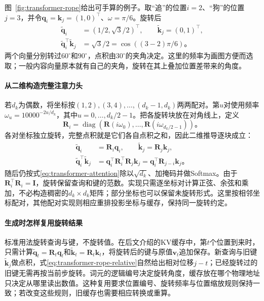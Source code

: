 图~\ref{fig:transformer-rope}给出可手算的例子。取“追”的位置$i=2$、“狗”的位置$j=3$，并令$\bm q_i=\bm k_j=(1,0)^{\top}$、$\omega=\pi/6$。旋转后
\[
  \begin{aligned}
    \widetilde{\bm q}_i&=(1/2,\sqrt3/2)^{\top},\qquad
    \widetilde{\bm k}_j=(0,1)^{\top},\\
    \widetilde{\bm q}_i^{\top}\widetilde{\bm k}_j
      &=\sqrt3/2=\cos((3-2)\pi/6)\text{。}
  \end{aligned}
\]
两个向量分别转过$60^\circ$和$90^\circ$，点积由$30^\circ$的夹角决定。这里的频率为画图方便而选取；一般内容向量原本就有自己的夹角，旋转在其上叠加位置差带来的角度。

\paragraph{从二维构造完整注意力头}
若$d_k$为偶数，将坐标按$(1,2),(3,4),\ldots,(d_k-1,d_k)$两两配对。第$u$对使用频率$\omega_u=10000^{-2u/d_k}$，其中$u=0,\ldots,d_k/2-1$。把各旋转块放在对角线上，定义
\[
  \bm R_i=\operatorname{diag}\!\left(
    \bm R(i\omega_0),\ldots,\bm R(i\omega_{d_k/2-1})\right)\text{。}
\]
各对坐标独立旋转，完整点积就是它们各自点积之和，因此二维推导逐块成立：
\begin{equation}
  \begin{aligned}
    \widetilde{\bm q}_i&=\bm R_i\bm q_i,\qquad
    \widetilde{\bm k}_j=\bm R_j\bm k_j,\\
    \widetilde{\bm q}_i^{\top}\widetilde{\bm k}_j
      &=\bm q_i^{\top}\bm R_i^{\top}\bm R_j\bm k_j
       =\bm q_i^{\top}\bm R_{j-i}\bm k_j\text{。}
  \end{aligned}
  \label{eq:transformer-rope-relative}
\end{equation}
随后仍按式\eqref{eq:transformer-attention}除以$\sqrt{d_k}$、加掩码并做Softmax。由于$\bm R_i^{\top}\bm R_i=\bm I$，旋转保留查询和键的范数。实现只需逐坐标对计算正弦、余弦和乘加，不必构造稠密的$d_k\times d_k$矩阵；部分坐标也可以保留未旋转形式。这里按相邻坐标配对，其他配对实现则相应重排投影坐标与缓存，保持同一旋转约定。

\paragraph{生成时怎样复用旋转结果}
标准用法旋转查询与键，不旋转值。在后文介绍的KV缓存中，第$t$个位置到来时，只需计算$\widetilde{\bm q}_t=\bm R_t\bm q_t$和$\widetilde{\bm k}_t=\bm R_t\bm k_t$，将旋转后的键与原值$\bm v_t$追加保存。新查询与旧键$\widetilde{\bm k}_j$做点积，式\eqref{eq:transformer-rope-relative}自然给出相对位移$j-t$；已经旋转过的旧键无需再按当前步旋转。词元的逻辑编号决定旋转角度，缓存放在哪个物理地址只决定从哪里读出数值。这种复用要求位置编号、旋转频率与位置缩放规则保持一致；若改变这些规则，旧缓存也需要相应转换或重算。

